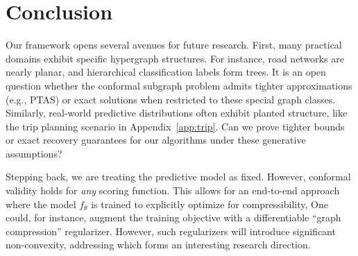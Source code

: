 \section{Conclusion}
\label{sec:conclusion}
Our framework opens several avenues for future research. First, many practical domains exhibit specific hypergraph structures. For instance, road networks are nearly planar, and hierarchical classification labels form trees. It is an open question whether the conformal subgraph problem admits tighter approximations (e.g., PTAS) or exact solutions when restricted to these special graph classes. Similarly, real-world predictive distributions often exhibit  planted structure, like the trip planning scenario in Appendix~\ref{app:trip}. Can we prove tighter bounds or exact recovery guarantees for our algorithms under these generative assumptions?

Stepping back, we are treating the predictive model as fixed. However, conformal validity holds for \textit{any} scoring function. This allows for an end-to-end approach where the model $f_\theta$ is trained to explicitly optimize for compressibility, One could, for instance, augment the training objective with a differentiable ``graph compression'' regularizer. However, such regularizers will introduce significant non-convexity, addressing which forms an interesting research direction.

